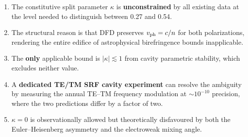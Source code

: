 \documentclass[11pt,a4paper]{article}
\theoremstyle{definition}
\begin{document}
\begin{enumerate}
\item The constitutive split parameter $\kappa$ is
  \textbf{unconstrained} by all existing data at the
  level needed to distinguish between 0.27 and 0.54.

\item The structural reason is that DFD preserves
  $v_{\rm ph} = c/n$ for both polarizations, rendering
  the entire edifice of astrophysical birefringence
  bounds inapplicable.

\item The \textbf{only} applicable bound is
  $|\kappa| \lesssim 1$ from cavity parametric stability,
  which excludes neither value.

\item A \textbf{dedicated TE/TM SRF cavity experiment}
  can resolve the ambiguity by measuring the annual
  TE--TM frequency modulation at $\sim 10^{-10}$
  precision, where the two predictions differ by a
  factor of two.

\item $\kappa = 0$ is observationally allowed but
  theoretically disfavoured by both the Euler--Heisenberg
  asymmetry and the electroweak mixing angle.
\end{enumerate}


\end{document}
